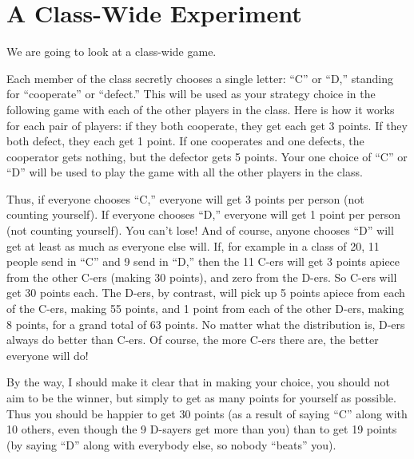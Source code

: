 \section{A Class-Wide Experiment}\label{S:CWPD}

We are going to look at a class-wide game. 


Each member of the class secretly chooses a single letter: ``C'' or ``D,'' standing for ``cooperate'' or ``defect.'' This will be used as your strategy choice in the following game with each of the other players in the class. Here is how it works for each pair of players:  if they both cooperate, they get each get 3 points. If they both defect, they each get 1 point. If one cooperates and one defects, the cooperator gets nothing, but the defector gets 5 points. Your one choice of ``C'' or ``D'' will be used to play the game with all the other players in the class. 

Thus, if everyone chooses ``C,'' everyone will get 3 points per person (not counting yourself). If everyone chooses ``D,'' everyone will get  1 point per person (not counting yourself). You can't lose! And of course, anyone chooses ``D'' will get at least as much as everyone else will. If, for example in a class of 20, 11 people send in ``C'' and 9 send in ``D,'' then the 11 C-ers will get 3 points apiece from the other C-ers (making 30 points), and zero from the D-ers. So C-ers will get 30 points each. The D-ers, by contrast, will pick up 5 points apiece from each of the C-ers, making 55 points, and 1 point from each of the other D-ers, making 8 points, for a grand total of 63 points. No matter what the distribution is, D-ers always do better than C-ers. Of course, the more C-ers there are, the better everyone will do!

By the way, I should make it clear that in making your choice, you should not aim to be the winner, but simply to get as many points for yourself as possible. Thus you should be happier to get 30 points (as a result of saying ``C'' along with 10 others, even though the 9 D-sayers get more than you) than to get 19 points (by saying ``D'' along with everybody else, so nobody ``beats'' you). 

